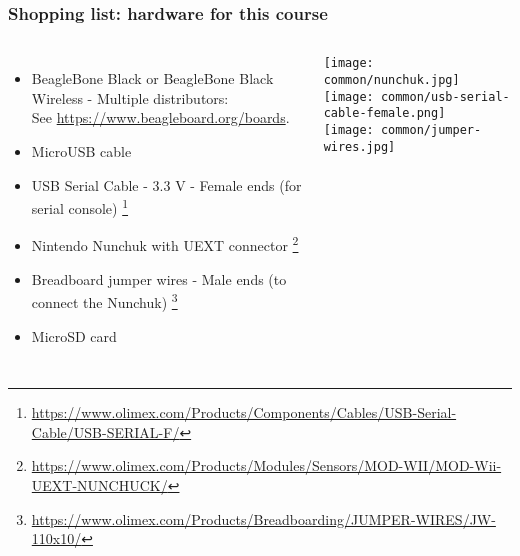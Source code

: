 \begin{frame}
\frametitle{Shopping list: hardware for this course}
  \begin{columns}
    \footnotesize
    \begin{itemize}
    \item BeagleBone Black or BeagleBone Black Wireless - Multiple distributors: \\
      See \url{https://www.beagleboard.org/boards}.
    \item MicroUSB cable
    \item USB Serial Cable - 3.3 V - Female ends (for serial console)
      \footnote{\tiny \url{https://www.olimex.com/Products/Components/Cables/USB-Serial-Cable/USB-SERIAL-F/}}
    \item Nintendo Nunchuk with UEXT connector
      \footnote{\tiny \url{https://www.olimex.com/Products/Modules/Sensors/MOD-WII/MOD-Wii-UEXT-NUNCHUCK/}}
    \item Breadboard jumper wires - Male ends (to connect the Nunchuk)
      \footnote{\tiny \url{https://www.olimex.com/Products/Breadboarding/JUMPER-WIRES/JW-110x10/}}
    \item MicroSD card
    \end{itemize}
    \texttt{[image: common/nunchuk.jpg]} \\
    \texttt{[image: common/usb-serial-cable-female.png]} \\
    \texttt{[image: common/jumper-wires.jpg]}
  \end{columns}
\end{frame}
